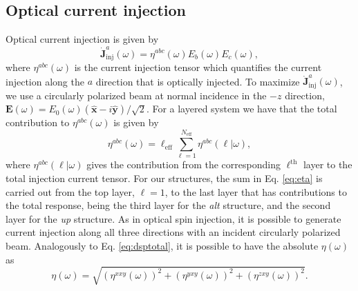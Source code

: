 \documentclass[pss]{wiley2sp} %
\begin{document}
\subsection{Optical current injection}\label{sec:theory-OCI}

Optical current injection is given \cite{arzatePRB14} by
\begin{equation*}
\mathbf{\dot{J}}^{a}_{\text{inj}}(\omega) =
\eta^{abc}(\omega)E_{b}(\omega)E_{c}(\omega), \label{eq:current}
\end{equation*}
where $\eta^{abc}(\omega)$ is the current injection tensor which quantifies
the current injection along the $a$ direction that is optically injected. To
maximize $\mathbf{\dot{J}}^{a}_{\text{inj}}(\omega)$, we use a circularly
polarized beam at normal incidence in the $-z$  direction, $\mathbf{E}(\omega)
= E_{0}(\omega)(\mathbf{\hat{x}} - i\mathbf{\hat{y}})/\sqrt{2}$. For a layered
system we have that the total contribution to $
\eta^{abc}(\omega)$ is given \cite{arzatePRB14} by
\begin{equation}\label{eq:eta}
\eta^{abc}(\omega)=
\ell_{\mathrm{eff}}\sum_{\ell=1}^{N_{\mathrm{eff}}}\eta^{abc}(\ell|\omega),
\end{equation}
where $\eta^{abc}(\ell|\omega)$ gives the contribution from the corresponding
$\ell^{\mathrm{th}}$ layer to the total injection current tensor. For our structures,
the sum in Eq. \eqref{eq:eta} is carried out from the top layer, $\ell=1$, to
the last layer that has contributions to the total response, being the third layer
for the \emph{alt} structure, and the second layer for the \emph{up}
structure. 
As in
optical spin injection, it is possible to generate current injection along all
three directions with an incident circularly polarized beam. Analogously to Eq.
\eqref{eq:dsptotal}, it is possible to have the absolute $\eta(\omega)$
\cite{arzatePRB14} as
\begin{equation}\label{eq:etatotal}
\eta(\omega) =
\sqrt{(\eta^{xxy}(\omega))^{2} +
      (\eta^{yxy}(\omega))^{2} +
      (\eta^{zxy}(\omega))^{2}
      }.
\end{equation}
\end{document}

